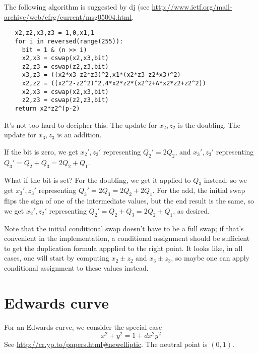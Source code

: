 \documentclass[a4paper]{article}
\begin{document}
The following algorithm is suggested by dj (see
\url{http://www.ietf.org/mail-archive/web/cfrg/current/msg05004.html}.
\begin{verbatim}
   x2,z2,x3,z3 = 1,0,x1,1
   for i in reversed(range(255)):
     bit = 1 & (n >> i)
     x2,x3 = cswap(x2,x3,bit)
     z2,z3 = cswap(z2,z3,bit)
     x3,z3 = ((x2*x3-z2*z3)^2,x1*(x2*z3-z2*x3)^2)
     x2,z2 = ((x2^2-z2^2)^2,4*x2*z2*(x2^2+A*x2*z2+z2^2))
     x2,x3 = cswap(x2,x3,bit)
     z2,z3 = cswap(z2,z3,bit)
   return x2*z2^(p-2)
\end{verbatim}
It's not too hard to decipher this. The update for $x_2, z_2$ is the
doubling. The update for $x_3, z_3$ is an addition.

If the bit is zero, we get $x_2', z_2'$ representing $Q_2' = 2 Q_2$,
and $x_3', z_3'$ representing $Q_3' = Q_2 + Q_3 = 2 Q_2 + Q_1$.

What if the bit is set? For the doubling, we get it applied to $Q_3$
instead, so we get $x_3', z_3'$ representing $Q_3' = 2 Q_3 = 2 Q_2 + 2
Q_1$. For the add, the initial swap flips the sign of one of the
intermediate values, but the end result is the same, so we get $x_2',
z_2'$ representing $Q_2' = Q_2 + Q_3 = 2 Q_2 + Q_1$, as desired.

Note that the initial conditional swap doesn't have to be a full swap;
if that's convenient in the implementation, a conditional assignment
should be sufficient to get the duplication formula appplied to the
right point. It looks like, in all cases, one will start by computing
$x_2 \pm z_2$ and $x_3 \pm z_3$, so maybe one can apply conditional
assignment to these values instead.

\section{Edwards curve}

For an Edwards curve, we consider the special case
\begin{equation*}
  x^2 + y^2 = 1 + d x^2 y^2
\end{equation*}
See \url{http://cr.yp.to/papers.html#newelliptic}. The neutral point is
$(0, 1)$.
\end{document}
